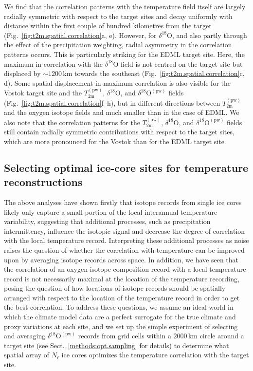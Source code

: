\documentclass[cp]{copernicus}
\begin{document}
We find that the correlation patterns with the temperature field itself are
largely radially symmetric with respect to the target sites and decay uniformly
with distance within the first couple of hundred kilometres from the target
(Fig.~\ref{fig:t2m.spatial.correlation}a, e). However, for
$\delta^{18}\mathrm{O}$, and also partly through the effect of the precipitation
weighting, radial asymmetry in the correlation patterns occurs. This is
particularly striking for the EDML target site. Here, the maximum in correlation
with the $\delta^{18}\mathrm{O}$ field is not centred on the target site but
displaced by $\sim1200$\,km towards the southeast
(Fig.~\ref{fig:t2m.spatial.correlation}c, d). Some spatial displacement in
maximum correlation is also visible for the Vostok target site and the
$T_{2\mathrm{m}}^{\mathrm{(pw)}}$, $\delta^{18}\mathrm{O}$, and
$\delta^{18}\mathrm{O}^{\mathrm{(pw)}}$ fields
(Fig.~\ref{fig:t2m.spatial.correlation}f--h), but in different directions
between $T_{2\mathrm{m}}^{\mathrm{(pw)}}$ and the oxygen isotope fields and much
smaller than in the case of EDML. We also note that the correlation patterns for
the $T_{2\mathrm{m}}^{\mathrm{(pw)}}$, $\delta^{18}\mathrm{O}$, and
$\delta^{18}\mathrm{O}^{\mathrm{(pw)}}$ fields still contain radially symmetric
contributions with respect to the target sites, which are more pronounced for
the Vostok than for the EDML target site.

\subsection{Selecting optimal ice-core sites for temperature reconstructions}
\label{results:picking}

The above analyses have shown firstly that isotope records from single ice cores
likely only capture a small portion of the local interannual temperature
variability, suggesting that additional processes, such as precipitation
intermittency, influence the isotopic signal and decrease the degree of
correlation with the local temperature record. Interpreting these additional
processes as noise raises the question of whether the correlation with
temperature can be improved upon by averaging isotope records across space. In
addition, we have seen that the correlation of an oxygen isotope composition
record with a local temperature record is not necessarily maximal at the
location of the temperature recording, posing the question of how locations of
isotope records should be spatially arranged with respect to the location of the
temperature record in order to get the best correlation. To address these
questions, we assume an ideal world in which the climate model data are a
perfect surrogate for the true climate and proxy variations at each site, and we
set up the simple experiment of selecting and averaging
$\delta^{18}\mathrm{O}^{\mathrm{(pw)}}$ records from grid cells within a
$2000$\,km circle around a target site (see Sect.~\ref{methods:opt.sampling} for
details) to determine what spatial array of $N_{\ell}$ ice cores optimizes the
temperature correlation with the target site.
\end{document}
